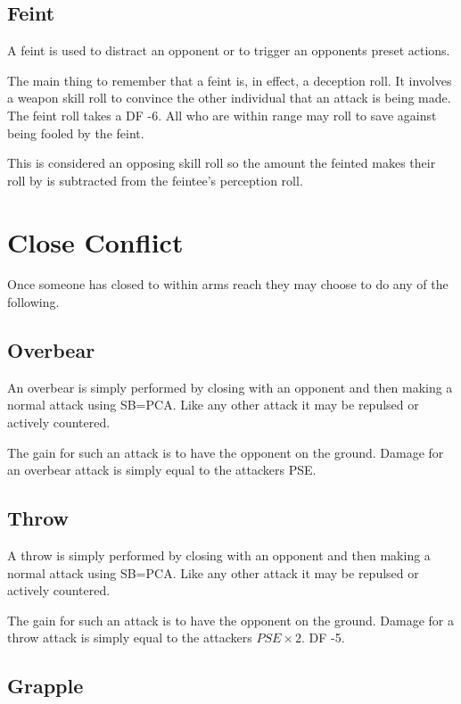 \subsection{Feint}

A feint is used to distract an opponent or to trigger an opponents
preset actions.

The main thing to remember that a feint is, in effect, a deception
roll. It involves a weapon skill roll to convince the other
individual that an attack is being made. The feint roll takes a DF
-6. All who are within range may roll to save against
being fooled by the feint.

This is considered an opposing skill roll so the amount the feinted makes
their roll by is subtracted from the feintee's perception roll.

\section{Close Conflict}

Once someone has closed to within arms reach they may choose to do
any of the following.

\subsection{Overbear}

An overbear is simply performed by closing with an opponent and then
making a normal attack using SB=PCA. Like any other attack it may be
repulsed or actively countered.

The gain for such an attack is to have the opponent on the ground.
Damage for an overbear attack is simply equal to the attackers PSE.

\subsection{Throw}

A throw is simply performed by closing with an opponent and then
making a normal attack using SB=PCA. Like any other attack it may be
repulsed or actively countered.

The gain for such an attack is to have the opponent on the ground.
Damage for a throw attack is simply equal to the attackers \( PSE \times 2\).
DF -5.

\subsection{Grapple}

